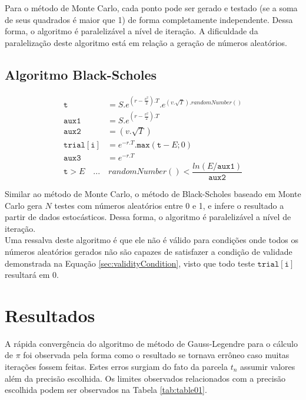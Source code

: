 \documentclass[12pt]{article}
\begin{document}
Para o método de Monte Carlo, cada ponto pode ser gerado e testado (se a soma de seus quadrados
é maior que 1) de forma completamente independente. Dessa forma, o algoritmo é paralelizável
a nível de iteração. A dificuldade da paralelização deste algoritmo está em relação a geração
de números aleatórios. 

\subsection{Algoritmo Black-Scholes}

\begin{equation}
	\begin{aligned}
		\mathtt{t}			&= S.e^{(r-\frac{v^2}{2}).T}.e^{(v.\sqrt{T}).randomNumber()}\\
		\mathtt{aux1}		&= S.e^{(r-\frac{v^2}{2}).T}\\
		\mathtt{aux2}		&= (v.\sqrt{T})\\
		\mathtt{trial[i]}	&= e^{-r.T}.\mathtt{max}(\mathtt{t}-E;0)\\
		\mathtt{aux3}		&= e^{-r.T}
	\end{aligned}
\end{equation}
\begin{equation}
	\mathtt{t}>E \quad ... \quad randomNumber() < \frac{ln(E/\mathtt{aux1})}{\mathtt{aux2}}
	\label{sec:validityCondition}
\end{equation}

Similar ao método de Monte Carlo, o método de Black-Scholes baseado em Monte Carlo gera $N$
testes com números aleatórios entre 0 e 1, e infere o resultado a partir de dados estocásticos.
Dessa forma, o algoritmo é paralelizável a nível de iteração. \\
Uma ressalva deste algoritmo é que ele não é válido para condições onde todos os números
aleatórios gerados não são capazes de satisfazer a condição de validade demonstrada
na Equação \ref{sec:validityCondition}, visto que todo teste $\mathtt{trial[i]}$ resultará em 0.

\section{Resultados}

A rápida convergência do algoritmo de método de Gauss-Legendre para o cálculo de $\pi$
foi observada pela forma como o resultado se tornava errôneo caso muitas iterações fossem feitas.
Estes erros surgiam do fato da parcela $t_n$ assumir valores além da precisão escolhida.
Os limites observados relacionados com a precisão escolhida podem ser observados na
Tabela \ref{tab:table01}.
\end{document}
